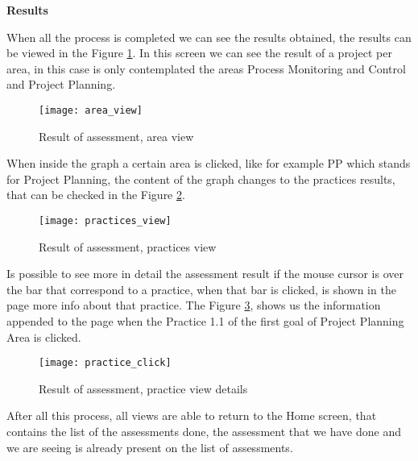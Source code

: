 \vspace{10 mm}

\textbf{Results}

When all the process is completed we can see the results obtained, the results can be viewed in the Figure \ref{fig:area_view}. In this screen we can see the result of a project per area, in this case is only contemplated the areas Process Monitoring and Control and Project Planning.

\begin{figure}[h]
	\begin{center}
		\leavevmode
		\texttt{[image: area\_view]}
		\caption{Result of assessment, area view}
		\label{fig:area_view}
	\end{center}
\end{figure}

When inside the graph a certain area is clicked, like for example PP which stands for Project Planning, the content of the graph changes to the practices results, that can be checked in the Figure \ref{fig:practices_view}.


\begin{figure}[!htb]
	\begin{center}
		\leavevmode
		\texttt{[image: practices\_view]}
		\caption{Result of assessment, practices view}
		\label{fig:practices_view}
	\end{center}
\end{figure}

Is possible to see more in detail the assessment result if the mouse cursor is over the bar that correspond to a practice, when that bar is clicked, is shown in the page more info about that practice. The Figure \ref{fig:practice_click}, shows us the information appended to the page when the Practice 1.1 of the first goal of Project Planning Area is clicked.

\begin{figure}[!htb]
	\begin{center}
		\leavevmode
		\texttt{[image: practice\_click]}
		\caption{Result of assessment, practice view details}
		\label{fig:practice_click}
	\end{center}
\end{figure}

After all this process, all views are able to return to the Home screen, that contains the list of the assessments done, the assessment that we have done and we are seeing is already present on the list of assessments.

